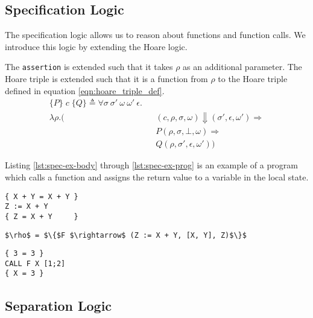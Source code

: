\subsection{Specification Logic}
The specification logic allows us to reason about functions and function calls. We introduce this logic by extending the Hoare logic.

The \verb|assertion| is extended such that it takes $\rho$ as an additional parameter. The Hoare triple is extended such that it is a function from $\rho$ to the Hoare triple defined in equation \ref{eqn:hoare_triple_def}.
\begin{equation}
\begin{alignedat}{2}
\{P\}\;c\;\{Q\} \triangleq \forall \sigma \: \sigma' \: \omega \: \omega' \: \epsilon .\\
 \lambda\rho.(
  && (c,\rho,\sigma,\omega) \Downarrow (\sigma', \epsilon, \omega') \Rightarrow\\
&& P(\rho,\sigma,\bot,\omega) \Rightarrow\\
&& Q(\rho,\sigma',\epsilon,\omega'))
\end{alignedat}
\end{equation}

Listing \ref{lst:spec-ex-body} through \ref{lst:spec-ex-prog} is an example of a program which calls a function and assigns the return value to a variable in the local state.

\begin{lstlisting}[mathescape=true,keepspaces=true,label=lst:spec-ex-body,caption=The body of the function F]
{ X + Y = X + Y }
Z := X + Y
{ Z = X + Y     }
\end{lstlisting}

\begin{lstlisting}[mathescape=true,keepspaces=true,label=lst:spec-ex-env,caption=A partial function space containing the function F.]
$\rho$ = $\{$F $\rightarrow$ (Z := X + Y, [X, Y], Z)$\}$
\end{lstlisting}

\begin{lstlisting}[mathescape=true,keepspaces=true,label=lst:spec-ex-prog,caption=A program which call the function F and stores the result in X]
{ 3 = 3 }
CALL F X [1;2]
{ X = 3 }
\end{lstlisting}

\subsection{Separation Logic}

